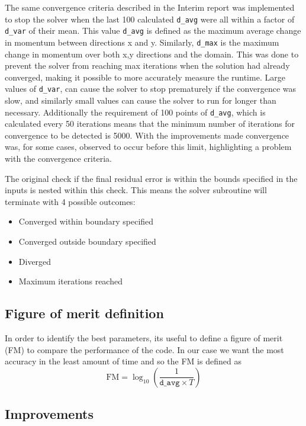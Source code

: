 \documentclass{article}
\begin{document}
The same convergence criteria described in the Interim report \cite{interim} was implemented to stop the solver when the last 100 calculated \texttt{d\_avg} were all within a factor of \texttt{d\_var} of their mean.
This value \texttt{d\_avg} is defined as the maximum average change in momentum between directions x and y.
Similarly, \texttt{d\_max} is the maximum change in momentum over both x,y directions and the domain.
This was done to prevent the solver from reaching max iterations when the solution had already converged, making it possible to more accurately measure the runtime.
Large values of \texttt{d\_var}, can cause the solver to stop prematurely if the convergence was slow, and similarly small values
can cause the solver to run for longer than necessary.
Additionally the requirement of 100 points of \texttt{d\_avg}, which is calculated every 50 iterations means that the minimum number of iterations for convergence to be detected is 5000.
With the improvements made convergence was, for some cases, observed to occur before this limit, highlighting a problem with the convergence criteria.

The original check if the final residual error is within the bounds specified in the inputs is nested within this check.
This means the solver subroutine will terminate with 4 possible outcomes:
\begin{itemize}
    \item Converged within boundary specified
    \item Converged outside boundary specified
    \item Diverged
    \item Maximum iterations reached
\end{itemize}

\subsection{Figure of merit definition}
In order to identify the best parameters, its useful to define a figure of merit (FM) to compare the performance of the code.
In our case we want the most accuracy in the least amount of time and so the FM is defined as
\begin{equation}
    \text{FM} = \log_{10} \left( \frac{1}{\texttt{d\_avg} \times T} \right) \label{eq:FM}
\end{equation}

\subsection{Improvements}
\end{document}
